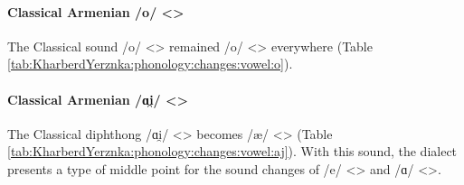 \paragraph{Classical Armenian /o/ <>}

The Classical sound /o/ <> remained /o/ <> everywhere (Table \ref{tab:KharberdYerznka:phonology:changes:vowel:o}). 


\begin{table}[H]
	\centering 
	\caption{Change from Classical Armenian /o/ <> to /o/ <> in the Kharberd-Yerznka dialect}
	\label{tab:KharberdYerznka:phonology:changes:vowel:o}
\end{table}


\paragraph{Classical Armenian /ɑi̯/ <>}


The Classical diphthong /ɑi̯/ <> becomes /æ/ <> (Table \ref{tab:KharberdYerznka:phonology:changes:vowel:aj}). With this sound, the dialect presents a type of middle point for the sound changes of /e/ <> and /ɑ/ <>.

